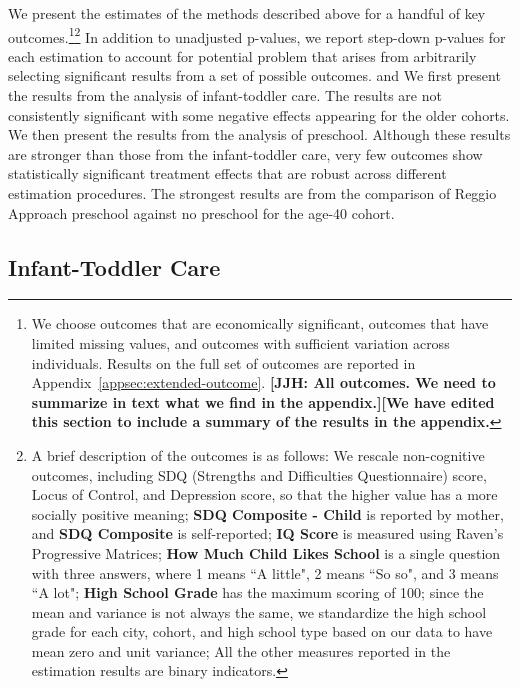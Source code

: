 We present the estimates of the methods described above for a handful of key outcomes.\footnote{We choose outcomes that are economically significant,  outcomes that have limited missing values, and outcomes with sufficient variation across individuals. Results on the full set of outcomes are reported in Appendix~\ref{appsec:extended-outcome}. \textbf{[JJH: All outcomes. We need to summarize in text what we find in the appendix.][We have edited this section to include a summary of the results in the appendix.}}\footnote{A brief description of the outcomes is as follows: We rescale non-cognitive outcomes, including SDQ (Strengths and Difficulties Questionnaire) score, Locus of Control, and Depression score, so that the higher value has a more socially positive meaning; \textbf{SDQ Composite - Child} is reported by mother, and \textbf{SDQ Composite} is self-reported; \textbf{IQ Score} is measured using Raven's Progressive Matrices; \textbf{How Much Child Likes School} is a single question with three answers, where 1 means ``A little", 2 means ``So so", and 3 means ``A lot";  \textbf{High School Grade} has the maximum scoring of 100; since the mean and variance is not always the same, we standardize the high school grade for each city, cohort, and high school type based on our data to have mean zero and unit variance; All the other measures reported in the estimation results are binary indicators.} In addition to unadjusted p-values, we report step-down p-values for each estimation to account for potential problem that arises from arbitrarily selecting significant results from a set of possible outcomes. and We first present the results from the analysis of infant-toddler care. The results are not consistently significant with some negative effects appearing for the older cohorts. We then present the results from the analysis of preschool. Although these results are stronger than those from the infant-toddler care, very few outcomes show statistically significant treatment effects that are robust across different estimation procedures. The strongest results are from the comparison of Reggio Approach preschool against no preschool for the age-40 cohort. 

\subsection{Infant-Toddler Care}

